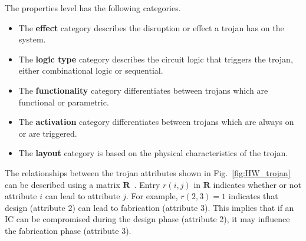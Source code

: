 \documentclass[journal, hidelinks]{IEEEtran}
\begin{document}
The properties level has the following categories.
\begin{itemize}
	\item The \textbf{effect} category describes the disruption or effect a trojan has on the system.
	\item The \textbf{logic type} category describes the circuit logic that triggers the trojan, either combinational logic or sequential.
	\item The \textbf{functionality} category differentiates between trojans which are functional or parametric.
	\item The \textbf{activation} category differentiates between trojans which are always on or are triggered.
	\item The \textbf{layout} category is based on the physical characteristics of the trojan.
\end{itemize}
The relationships between the trojan attributes shown in Fig.~\ref{fig:HW_trojan} can be described using a matrix $\mathbf{R}$~\cite{samerAttribute}.
Entry $r(i,j)$ in $\mathbf{R}$ indicates whether or not attribute $i$ can lead to attribute $j$.
For example, $r(2,3) = 1$ indicates that design (attribute 2) can lead to fabrication (attribute 3).
This implies that if an IC can be compromised during the design phase (attribute 2), it may influence the fabrication phase (attribute 3).
\end{document}
